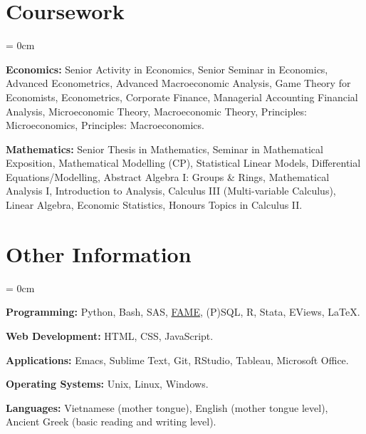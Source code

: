 \documentclass[a4paper, 11pt]{article}
\begin{document}
  \section{Coursework}
    \begin{compactitem}\parskip = 0cm
      \item \textbf{Economics:} Senior Activity in Economics, Senior Seminar in Economics, Advanced Econometrics, Advanced Macroeconomic Analysis, Game Theory for Economists, Econometrics, Corporate Finance,  Managerial Accounting Financial Analysis, Microeconomic Theory,  Macroeconomic Theory, Principles: Microeconomics, Principles: Macroeconomics.
      \item  \textbf{Mathematics:} Senior Thesis in Mathematics, Seminar in Mathematical Exposition, Mathematical Modelling (CP), Statistical Linear Models, Differential Equations/Modelling, Abstract Algebra I: Groups \& Rings, Mathematical Analysis I, Introduction to Analysis, Calculus III (Multi-variable Calculus), Linear Algebra, Economic Statistics, Honours Topics in Calculus II.
    \end{compactitem}

  \section{Other Information}
    \begin{compactitem}\parskip = 0cm
      \item \textbf{Programming:} Python, Bash, SAS, \href{https://en.wikipedia.org/wiki/FAME_(database)}{FAME}, (P)SQL, R, Stata, EViews, \LaTeX.
      \item \textbf{Web Development:} HTML, CSS, JavaScript.
      \item \textbf{Applications:} Emacs, Sublime Text, Git, RStudio, Tableau, Microsoft Office.
      \item \textbf{Operating Systems:} Unix, Linux, Windows.
      \item \textbf{Languages:} Vietnamese (mother tongue), English (mother tongue level), Ancient Greek (basic reading and writing level).
    \end{compactitem}

% 


  \iffalse
  \begin{publications}
    \printbib{books}
    \printbib{selected}
    \printbib{chapters}
    \printbib{conferences}
    \printbib{techreports} 
    \printbib{bookreviews}
    \printbib{editorials}
  \end{publications}
  \fi
\end{document}
